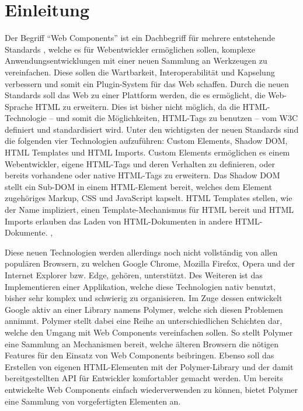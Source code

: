 \chapter{Einleitung}\label{einleitung}

Der Begriff ``Web Components'' ist ein Dachbegriff für mehrere entstehende Standards \cite{citeulike:13844988}, welche es für Webentwickler ermöglichen sollen, komplexe Anwendungsentwicklungen mit einer neuen Sammlung an Werkzeugen zu vereinfachen. Diese sollen die Wartbarkeit, Interoperabilität und Kapselung verbessern und somit ein Plugin-System für das Web schaffen. Durch die neuen Standards soll das Web zu einer Plattform werden, die es ermöglicht, die Web-Sprache \ac{HTML} zu erweitern. Dies ist bisher nicht möglich, da die \ac{HTML}-Technologie -- und somit die Möglichkeiten, \ac{HTML}-Tags zu benutzen -- vom \ac{W3C} definiert und standardisiert wird. Unter den wichtigsten der neuen Standards sind die folgenden vier Technologien aufzuführen: Custom Elements, Shadow \ac{DOM}, \ac{HTML} Templates und \ac{HTML} Imports. Custom Elements ermöglichen es einem Webentwickler, eigene \ac{HTML}-Tags und deren Verhalten zu definieren, oder bereits vorhandene oder native \ac{HTML}-Tags zu erweitern. Das Shadow \ac{DOM} stellt ein Sub-\ac{DOM} in einem \ac{HTML}-Element bereit, welches dem Element zugehöriges Markup, \ac{CSS} und JavaScript kapselt. \ac{HTML} Templates stellen, wie der Name impliziert, einen Template-Mechanismus für \ac{HTML} bereit und \ac{HTML} Imports erlauben das Laden von \ac{HTML}-Dokumenten in andere \ac{HTML}-Dokumente. \cite{citeulike:13842702}, \cite{citeulike:13842701}

Diese neuen Technologien werden allerdings noch nicht vollständig von allen populären Browsern, zu welchen Google Chrome, Mozilla Firefox, Opera und der Internet Explorer bzw. Edge, gehören, unterstützt. Des Weiteren ist das Implementieren einer Applikation, welche diese Technologien nativ benutzt, bisher sehr komplex und schwierig zu organisieren. Im Zuge dessen entwickelt Google aktiv an einer Library namens Polymer, welche sich diesen Problemen annimmt. Polymer stellt dabei eine Reihe an unterschiedlichen Schichten dar, welche den Umgang mit Web Components vereinfachen sollen. So stellt Polymer eine Sammlung an Mechanismen bereit, welche älteren Browsern die nötigen Features für den Einsatz von Web Components beibringen. Ebenso soll das Erstellen von eigenen \ac{HTML}-Elementen mit der Polymer-Library und der damit bereitgestellten \ac{API} für Entwickler komfortabler gemacht werden. Um bereits entwickelte Web Components einfach wiederverwenden zu können, bietet Polymer eine Sammlung von vorgefertigten Elementen an.

